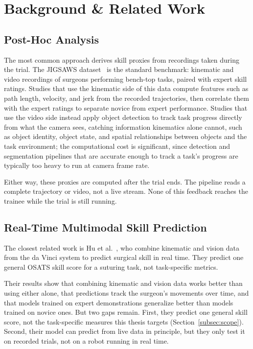 \section{Background \& Related Work}
\label{sec:background}
\subsection{Post-Hoc Analysis}

The most common approach derives skill proxies from recordings taken
during the trial. The JIGSAWS dataset~\cite{jigsaws} is the standard
benchmark: kinematic and video recordings of surgeons performing
bench-top tasks, paired with expert skill ratings. Studies that use the
kinematic side of this data compute features such as path length,
velocity, and jerk from the recorded trajectories, then correlate them
with the expert ratings to separate novice from expert performance.
Studies that use the video side instead apply object detection to track
task progress directly from what the camera sees, catching information
kinematics alone cannot, such as object identity, object state, and
spatial relationships between objects and the task environment; the
computational cost is significant, since detection and segmentation pipelines 
that are accurate enough to track a task's progress are typically too heavy to 
run at camera frame rate.

Either way, these proxies are computed after the trial ends. The
pipeline reads a complete trajectory or video, not a live stream. None
of this feedback reaches the trainee while the trial is still running.

\subsection{Real-Time Multimodal Skill Prediction}

The closest related work is Hu et al.~\cite{hu2026}, who combine
kinematic and vision data from the da Vinci system to predict surgical
skill in real time. They predict one general OSATS skill score for a
suturing task, not task-specific metrics.

Their results show that combining kinematic and vision data works
better than using either alone, that predictions track the surgeon's
movements over time, and that models trained on expert demonstrations
generalize better than models trained on novice ones. But two
gaps remain. First, they predict one general skill score, not the
task-specific measures this thesis targets (Section~\ref{subsec:scope}).
Second, their model can predict from live data in principle, but they
only test it on recorded trials, not on a robot running in real time.

